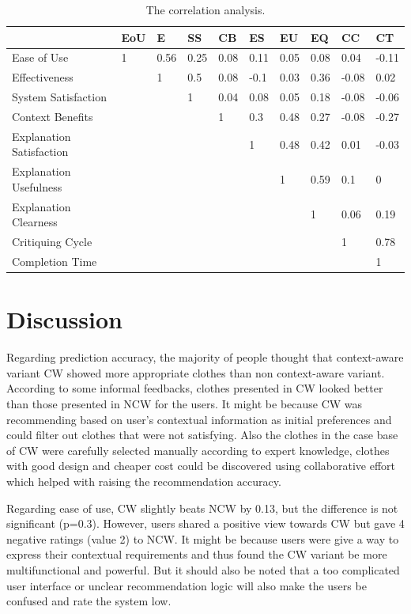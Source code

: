 \begin{table}[H]
	\centering
	\caption{The correlation analysis.}
	\label{tab:correlation}
	\small
	\begin{tabular}{p{1.2in}p{0.3in}p{0.3in}p{0.3in}p{0.3in}p{0.3in}p{0.3in}p{0.3in}p{0.3in}p{0.3in}}
	          \hline
		 & EoU & E & SS & CB & ES & EU & EQ & CC & CT \\ \hline
		Ease of Use & 1 & 0.56 & 0.25 & 0.08 & 0.11 & 0.05 & 0.08 & 0.04 & -0.11 \\
		Effectiveness &  & 1 & 0.5 & 0.08 & -0.1 & 0.03 & 0.36 & -0.08 & 0.02 \\
		System Satisfaction &  &  & 1 & 0.04 & 0.08 & 0.05 & 0.18 & -0.08 & -0.06 \\
		Context Benefits &  &  &  & 1 & 0.3 & 0.48 & 0.27 & -0.08 & -0.27 \\
		Explanation Satisfaction &  &  &  &  & 1 & 0.48 & 0.42 & 0.01 & -0.03 \\
		Explanation Usefulness &  &  &  &  &  & 1 & 0.59 & 0.1 & 0 \\
		Explanation Clearness &  &  &  &  &  &  & 1 & 0.06 & 0.19 \\
		Critiquing Cycle &  &  &  &  &  &  &  & 1 & 0.78 \\
		Completion Time &  &  &  &  &  &  &  &  & 1 \\ \hline
	\end{tabular}
\end{table}

\section{Discussion} \label{sec:discussion}

Regarding prediction accuracy, the majority of people thought that context-aware variant CW showed more appropriate clothes than non context-aware variant. According to some informal feedbacks, clothes presented in CW looked better than those presented in NCW for the users. It might be because CW was recommending based on user's contextual information as initial preferences and could filter out clothes that were not satisfying. Also the clothes in the case base of CW were carefully selected manually according to expert knowledge, clothes with good design and cheaper cost could be discovered using collaborative effort which helped with raising the recommendation accuracy.

Regarding ease of use, CW slightly beats NCW by 0.13, but the difference is not significant (p=0.3). However, users shared a positive view towards CW but gave 4 negative ratings (value 2) to NCW. It might be because users were give a way to express their contextual requirements and thus found the CW variant be more multifunctional and powerful. But it should also be noted that a too complicated user interface or unclear recommendation logic will also make the users be confused and rate the system low.

